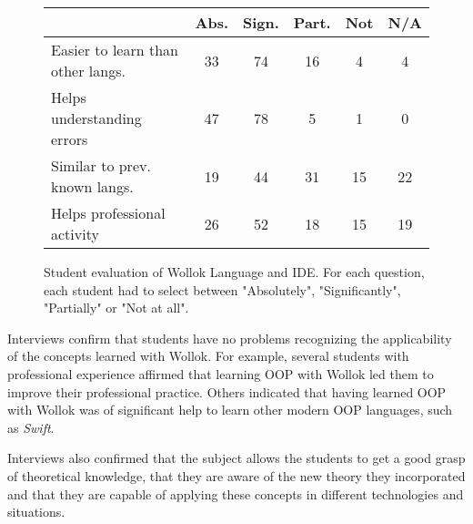 \begin{figure}[ht]
 \centering
 \footnotesize
 \begin{tabular}{|p{13em}|c|c|c|c|c|}
 	\hline
 	& Abs. & Sign. & Part. & Not & N/A \\
 	\hline
 	Easier to learn than other langs. & 33 & 74 & 16 & 4 & 4 \\
 	Helps understanding errors & 47 & 78 & 5 & 1 & 0 \\
 	Similar to prev. known langs. & 19 & 44 & 31 & 15 & 22 \\
 	Helps professional activity & 26 & 52 & 18 & 15 & 19 \\
 	\hline
 
 \end{tabular}

 \caption{\small Student evaluation of Wollok Language and IDE. 
 For each question, each student had to select between "Absolutely", "Significantly", "Partially" or "Not at all".}
\label{fig:surveys/languageAppreciation}
\end{figure}

Interviews confirm that students have no problems recognizing the applicability of the concepts learned with Wollok.
For example, several students with professional experience affirmed that 
learning OOP with Wollok led them to improve their professional practice.
Others indicated that having learned OOP with Wollok was of significant help 
to learn other modern OOP languages, such as \emph{Swift}.


Interviews also confirmed that the subject allows the students to get a good grasp of theoretical knowledge, 
that they are aware of the new theory they incorporated
and that they are capable of applying these concepts in different technologies and situations.

